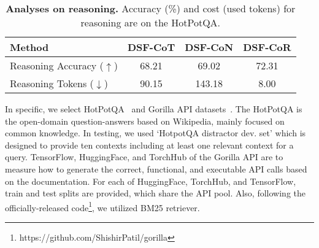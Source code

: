\begin{table}[t]
  \centering
  \begin{adjustbox}{width=\linewidth}
  \begin{tabular}{@{}lccc@{}}
    \toprule
    Method & DSF-CoT & DSF-CoN & \textbf{DSF-CoR} \\
    \midrule
    Reasoning Accuracy ($\uparrow$) & 68.21 & 69.02 & 72.31 \\
    Reasoning Tokens ($\downarrow$) & 90.15 & 143.18 & 8.00\\
    \bottomrule
    
  \end{tabular}
  \end{adjustbox}
  \caption{\textbf{Analyses on reasoning.} Accuracy (\%) and cost (used tokens) for reasoning are on the HotPotQA.}
  \label{tab:analysis}
  \vspace{-0.5cm}
\end{table}

In specific, we select HotPotQA~\cite{yang2018Hotpotqa} and Gorilla API datasets~\cite{patil2023gorilla}. The HotPotQA is the open-domain question-answers based on Wikipedia, mainly focused on common knowledge. In testing, we used `HotpotQA distractor dev. set' which is designed to provide ten contexts including at least one relevant context for a query. TensorFlow, HuggingFace, and TorchHub of the Gorilla API are to measure how to generate the correct, functional, and executable API calls based on the documentation. For each of HuggingFace, TorchHub, and TensorFlow, train and test splits are provided, which share the API pool. Also, following the officially-released code\footnote{https://github.com/ShishirPatil/gorilla}, we utilized BM25 retriever. 



